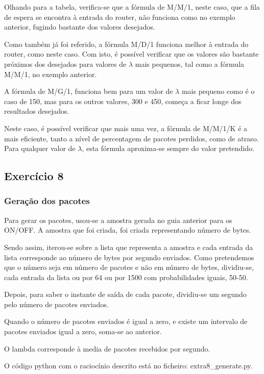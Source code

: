 \documentclass[pdftex,12pt,a4paper]{report}
\begin{document}

Olhando para a tabela, verifica-se que a fórmula de M/M/1, neste caso, que a fila de espera se encontra à entrada do router, não funciona como no exemplo anterior, fugindo bastante dos valores desejados.

Como também já foi referido, a fórmula M/D/1 funciona melhor à entrada do router, como neste caso. Com isto, é possível verificar que os valores são bastante próximos  dos desejados para valores de $\lambda$ mais pequenos, tal como a fórmula M/M/1, no exemplo anterior.

A fórmula de M/G/1, funciona bem para um valor de $\lambda$ mais pequeno como é o caso de 150, mas para os outros valores, 300 e 450, começa a ficar longe dos resultados desejados.

Neste caso, é possível verificar que mais uma vez, a fórmula de M/M/1/K é a mais eficiente, tanto a nível de percentagem de pacotes perdidos, como de atraso. Para qualquer valor de $\lambda$, esta fórmula aproxima-se sempre do valor pretendido.

\subsection{Exercício 8}

\subsubsection{Geração dos pacotes}
Para gerar os pacotes, usou-se a amostra gerada no guia anterior para os ON/OFF. A amostra que foi criada, foi criada representando número de bytes.

Sendo assim, iterou-se sobre a lista que representa a amostra e cada entrada da lista corresponde ao número de bytes por segundo enviados. Como pretendemos que o número seja em número de pacotes e não em número de bytes, dividiu-se, cada entrada da lista ou por 64 ou por 1500 com probabilidades iguais, 50-50.

Depois, para saber o instante de saída de cada pacote, dividiu-se um segundo pelo número de pacotes enviados.

Quando o número de pacotes enviados é igual a zero, e existe um intervalo de pacotes enviados igual a zero, soma-se ao anterior.

O lambda corresponde à media de pacotes recebidos por segundo.

O código python com o raciocínio descrito está no ficheiro: extra8\_generate.py.
\end{document}
